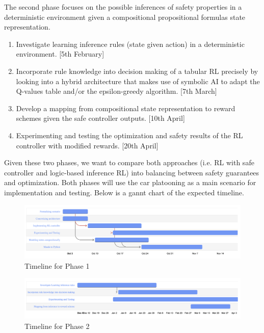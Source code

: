 \documentclass[a4paper,11pt]{article}
\begin{document}
The second phase focuses on the possible inferences of safety properties in a deterministic environment given a compositional propositional formulas
state representation. 
\begin{enumerate}
  \item Investigate learning inference rules (state given action) in a deterministic environment. [5th February]
  \item Incorporate rule knowledge into decision making of a tabular RL precisely by looking into a hybrid architecture that makes use of 
        symbolic AI to adapt the Q-values table and/or the epsilon-greedy algorithm. [7th March]
  \item Develop a mapping from compositional state representation to reward schemes given the safe controller outputs. [10th April]
  \item Experimenting and testing the optimization and safety results of the RL controller with modified rewards. [20th April]
\end{enumerate}

Given these two phases, we want to compare both approaches (i.e. RL with safe controller and logic-based inference RL) into balancing between safety guarantees and optimization. 
Both phases will use the car platooning as a main scenario for implementation and testing. Below is a gannt chart of the expected timeline. \newline 


\begin{figure}[H]
\includegraphics[scale=0.18]{phase-1.png}  
\caption{Timeline for Phase 1}
\label{fig:phase-1}
\end{figure}

\begin{figure}[H]
\includegraphics[scale=0.18]{phase-2.png}
\caption{Timeline for Phase 2}
\label{fig:phase-2}
\end{figure}

\newpage



\end{document}
